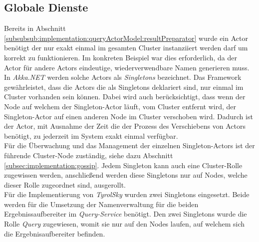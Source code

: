 \subsection{Globale Dienste}
\label{subsec:implementation:singeltons}
Bereits in Abschnitt \ref{subsubsub:implementation:queryActorModel:resultPreparator} wurde ein Actor benötigt der nur exakt einmal im gesamten Cluster instanziiert werden darf um korrekt zu funktionieren. Im konkreten Beispiel war dies erforderlich, da der Actor für andere Actors eindeutige, wiederverwendbare Namen generieren muss. In \textit{Akka.NET} werden solche Actors als \textit{Singletons} bezeichnet. Das Framework gewährleistet, dass die Actors die als Singletons deklariert sind, nur einmal im Cluster vorhanden sein können. Dabei wird auch berücksichtigt, dass wenn der Node auf welchem der Singleton-Actor läuft, vom Cluster entfernt wird, der Singleton-Actor auf einen anderen Node im Cluster verschoben wird. Dadurch ist der Actor, mit Ausnahme der Zeit die der Prozess des Verschiebens von Actors benötigt, zu jederzeit im System exakt einmal verfügbar. \\
Für die Überwachung und das Management der einzelnen Singleton-Actors ist der führende Cluster-Node zuständig, siehe dazu Abschnitt \ref{subsec:implementation:gossip}. Jedem Singleton kann auch eine Cluster-Rolle zugewissen werden, anschließend werden diese Singletons nur auf Nodes, welche dieser Rolle zugeordnet sind, ausgerollt. \\
Für die Implementierung von \textit{TyrolSky} wurden zwei Singletons eingesetzt. Beide werden für die Umsetzung der Namenverwaltung für die beiden Ergebnissaufbereiter im \textit{Query-Service} benötigt. Den zwei Singletons wurde die Rolle \textit{Query} zugewiesen, womit sie nur auf den Nodes laufen, auf welchem sich die Ergebnisaufbereiter befinden.

